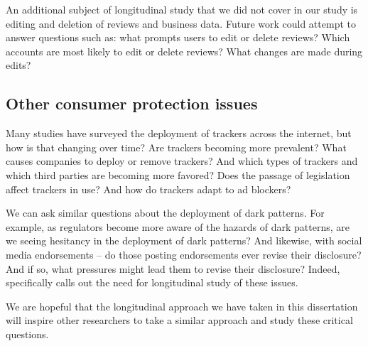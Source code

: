 An additional subject of longitudinal study that we did not cover in our study is editing and deletion of reviews and business data. Future work could attempt to answer questions such as: what prompts users to edit or delete reviews? Which accounts are most likely to edit or delete reviews? What changes are made during edits?

\subsection{Other consumer protection issues}\label{subsec:conclusion:other}
Many studies have surveyed the deployment of trackers across the internet, but how is that changing over time? Are trackers becoming more prevalent? What causes companies to deploy or remove trackers? And which types of trackers and which third parties are becoming more favored? Does the passage of legislation affect trackers in use? And how do trackers adapt to ad blockers?

We can ask similar questions about the deployment of dark patterns. For example, as regulators become more aware of the hazards of dark patterns, are we seeing hesitancy in the deployment of dark patterns? And likewise, with social media endorsements -- do those posting endorsements ever revise their disclosure? And if so, what pressures might lead them to revise their disclosure? Indeed, \citet{mathur2020identifying} specifically calls out the need for longitudinal study of these issues.

We are hopeful that the longitudinal approach we have taken in this dissertation will inspire other researchers to take a similar approach and study these critical questions.
